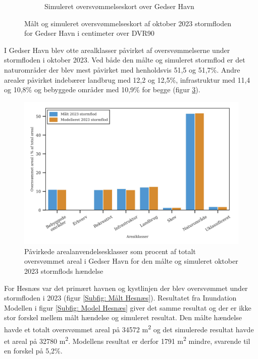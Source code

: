 \begin{figure}[H]
\begin{subfigure}[t]{0.5\textwidth}
        \caption{Simuleret oversvømmelseskort over Gedser Havn}
        \label{Subfig: Model Gedser}
    \end{subfigure}
    \caption{Målt og simuleret oversvømmelseskort af oktober 2023 stormfloden for Gedser Havn i centimeter over DVR90}
    \label{Figur: Målt & simuleret Gedser}
\end{figure}

I Gedser Havn blev otte arealklasser påvirket af oversvømmelserne under stormfloden i oktober 2023. Ved både den målte og simuleret stormflod er det naturområder der blev mest påvirket med henholdsvis 51,5 og 51,7\%. Andre arealer påvirket indebærer landbrug med 12,2 og 12,5\%, infrastruktur med 11,4 og 10,8\% og bebyggede områder med 10,9\% for begge (figur \ref{Figur: Påvirket arealanvendelse Gedser}).

\begin{figure}[H]
    \centering
    \includegraphics[width=0.8\linewidth]{images/Resultater/areal_anvendelses_grafer/gedser_arealanvendelse.jpg}
    \caption{Påvirkede arealanvendelsesklasser som procent af totalt oversvømmet areal i Gedser Havn for den målte og simuleret oktober 2023 stormflods hændelse}
    \label{Figur: Påvirket arealanvendelse Gedser}
\end{figure}

For Hesnæs var det primært havnen og kystlinjen der blev oversvømmet under stormfloden i 2023 (figur \ref{Subfig: Målt Hesnæs}). Resultatet fra Inundation Modellen i figur \ref{Subfig: Model Hesnæs} giver det samme resultat og der er ikke stor forskel mellem målt hændelse og simuleret resultat. Den målte hændelse havde et totalt oversvømmet areal på 34572 m\textsuperscript{2} og det simulerede resultat havde et areal på 32780 m\textsuperscript{2}. Modellens resultat er derfor 1791 m\textsuperscript{2} mindre, svarende til en forskel på 5,2\%.  

